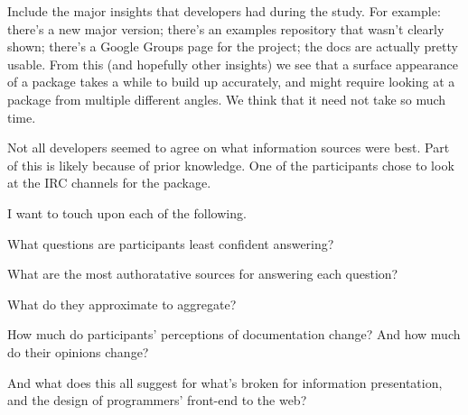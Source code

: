 Include the major insights that developers had during the study.
For example:
there's a new major version;
there's an examples repository that wasn't clearly shown;
there's a Google Groups page for the project;
the docs are actually pretty usable.
From this (and hopefully other insights) we see that a surface appearance of a package takes a while to build up accurately, and might require looking at a package from multiple different angles.
We think that it need not take so much time.

Not all developers seemed to agree on what information sources were best.
Part of this is likely because of prior knowledge.
One of the participants chose to look at the IRC channels for the package.

I want to touch upon each of the following.

What questions are participants least confident answering?

What are the most authoratative sources for answering each question?

What do they approximate to aggregate?

How much do participants' perceptions of documentation change?  And how much do their opinions change?

And what does this all suggest for what's broken for information presentation, and the design of programmers' front-end to the web?
\fi
